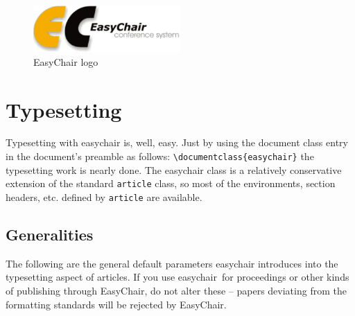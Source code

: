 \documentclass{easychair}
\newcommand{\easychair}{\textsf{easychair}}
\begin{document}
\begin{figure}[tb]
	\begin{centering}
	\includegraphics[width=0.5\textwidth]{logoEC}
	\caption{EasyChair logo}
	\label{fig:easychair-logo}
	\end{centering}
\end{figure}

\section{Typesetting}
\label{sect:typesetting}

Typesetting with {\easychair} is, well, easy.  Just by using the
document class entry in the document's preamble as follows:
\verb+\documentclass{easychair}+ the typesetting work is nearly done.
The {\easychair} class is a relatively conservative extension of the
standard \texttt{article} class, so most of the environments, section
headers, etc. defined by \texttt{article} are available.

\subsection{Generalities}
\label{sect:generalities}

The following are the general default parameters {\easychair}
introduces into the typesetting aspect of articles. If you use
\easychair\ for proceedings or other kinds of publishing through
EasyChair, do not alter these -- papers deviating from the formatting
standards will be rejected by EasyChair.
\end{document}
